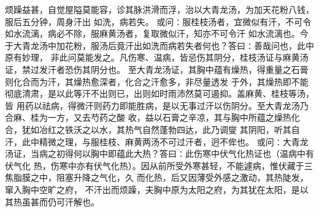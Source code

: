 \documentclass[a4paper,12pt,UTF8,twoside]{ctexbook}
\begin{document}
烦躁益甚，自觉屋隘莫能容，诊其脉洪滑而浮，治以大青龙汤，为加天花粉八钱，服后五分钟，周身汗出 
如洗，病若失。 
或问∶服桂枝汤者，宜微似有汗，不可令如水流漓，病必不除，服麻黄汤者，复取微似汗，知亦不可令汗 
如水流漓也。今于大青龙汤中加花粉，服汤后竟汗出如洗而病若失者何也？答曰∶善哉问也，此中原有妙理， 
非此问莫能发之。凡伤寒、温病，皆忌伤其阴分，桂枝汤证与麻黄汤证，禁过发汗者恐伤其阴分也。 
至大青龙汤证，其胸中蕴有燥热，得重量之石膏则化合而为汗，其燥热愈深者，化合之汗愈多，非尽量透发 
于外，其燥热即不能彻底清肃，是以此等汗不出则已，出则如时雨沛然莫可遏抑。盖麻黄、桂枝等汤，皆 
用药以祛病，得微汗则药力即能胜病，是以无事过汗以伤阴分。至大青龙汤乃合麻、桂为一方，又去芍药之酸 
收，益以石膏之辛凉，其与胸中所蕴之燥热化合，犹如冶红之铁沃之以水，其热气自然蓬勃四达，此乃调燮 
其阴阳，听其自汗，此中精微之理，与服桂枝、麻黄两汤不可过汗者，迥不侔也。 
或问∶大青龙汤证，当病之初得何以胸中即蕴此大热？答曰∶此伤寒中伏气化热证也（温病中有伏气化 
热，伤寒中亦有伏气化热）。因从前所受外寒甚轻，不能遽病，惟伏藏于三焦脂膜之中，阻塞升降之气化，久 
而化热，后又因薄受外感之激动，其热陡发，窜入胸中空旷之府， 
不汗出而烦躁，夫胸中原为太阳之府，为其犹在太阳，是以其热虽甚而仍可汗解也。 
\end{document}
